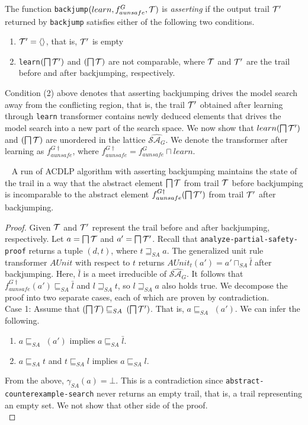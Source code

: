 {{ The function \texttt{backjump}$(learn,f_{aunsafe}^G, \mathcal{T})$ 
is \emph{asserting} if the output trail $\mathcal{T}'$ returned by \texttt{backjump} 
satisfies either of the following two conditions.
\begin{enumerate}
	\item $\mathcal{T}' = \langle \rangle$, that is, $\mathcal{T}'$ is empty
	\item \texttt{learn}$(\bigsqcap \mathcal{T}')$ and $(\bigsqcap \mathcal{T})$ 
		are not comparable, where $\mathcal{T}$ and $\mathcal{T}'$
		are the trail before and after backjumping, respectively.
\end{enumerate}
%
Condition (2) above denotes that asserting backjumping drives the model search 
away from the conflicting region, that is, the trail $\mathcal{T}'$ obtained after 
learning through \texttt{learn} transformer contains newly deduced elements 
that drives the model search into a new part of the search space. We now show 
that $learn(\bigsqcap \mathcal{T}')$ and $(\bigsqcap \mathcal{T})$ are unordered 
in the lattice $\widehat{\mathcal{SA}_G}$.  We denote the transformer after learning 
as $f_{aunsafe}^{G \dagger}$, where $f_{aunsafe}^{G \dagger} = f_{aunsafe}^{G} \sqcap learn$.
%
\begin{lemma}~\label{bjump}
A run of ACDLP algorithm with asserting backjumping maintains the 
state of the trail in a way that the abstract element $\bigsqcap \mathcal{T}$ 
from trail $\mathcal{T}$ before backjumping is incomparable to the abstract 
element $f_{aunsafe}^{G \dagger}(\bigsqcap \mathcal{T}')$ from trail $\mathcal{T}'$ 
after backjumping. 
\end{lemma}
%
\begin{proof}
Given $\mathcal{T}$ and $\mathcal{T}'$ represent the trail before and after backjumping, 
respectively.  Let $a = \bigsqcap \mathcal{T}$ and $a' = \bigsqcap \mathcal{T}'$.  Recall 
that \texttt{analyze-partial-safety-proof} returns a tuple $(d, t)$, where 
$t \sqsupseteq_{SA} a$.  The generalized unit rule transformer $AUnit$ with 
respect to $t$ returns $AUnit_t(a') = a' \sqcap_{SA} \bar{l}$ after backjumping. 
Here, $\bar{l}$ is a meet irreducible of $\widehat{\mathcal{SA}_G}$.  It follows 
that $f_{aunsafe}^{G \dagger}(a') \sqsubseteq_{SA} \bar{l}$ and $l \sqsupseteq_{SA} t$, 
so $l \sqsupseteq_{SA} a$ also holds true.  We decompose the proof into two separate 
cases, each of which are proven by contradiction. \\


Case 1: Assume that $(\bigsqcap \mathcal{T}) \sqsubseteq_{SA}$ \ltrans$(\bigsqcap \mathcal{T}')$. 
That is, $a \sqsubseteq_{SA}$ \ltrans$(a')$. We can infer the following.
\begin{enumerate}
	\item $a \sqsubseteq_{SA}$ \ltrans$(a')$ implies $a \sqsubseteq_{SA} \bar{l}$. 
	\item $a \sqsubseteq_{SA} t$ and $t \sqsubseteq_{SA} l$ implies $a \sqsubseteq_{SA} l$.
\end{enumerate}
From the above, $\gamma_{SA}(a) = \bot$. This is a contradiction since 
\texttt{abstract-counterexample-search} never returns an empty trail, that is, a trail representing an empty set.  We 
not show that other side of the proof. \\


\end{proof}}}
